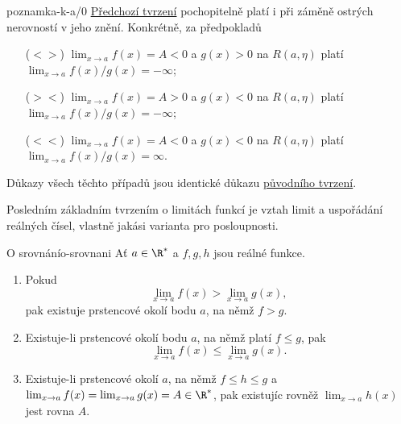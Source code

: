 \begin{remark}{}{poznamka-k-a/0}
 \hyperref[prop:limita-a/0]{Předchozí tvrzení} pochopitelně platí i při záměně
 ostrých nerovností v jeho znění. Konkrétně, za předpokladů
 \begin{itemize}
  \item[($< >$)] $\lim_{x \to a} f(x) = A < 0$ a $g(x) > 0$ na $R(a,\eta)$ platí
   $\lim_{x \to a} f(x) / g(x) = -\infty$;
  \item[($> <$)] $\lim_{x \to a} f(x) = A > 0$ a $g(x) < 0$ na $R(a,\eta)$ platí
   $\lim_{x \to a} f(x) / g(x) = -\infty$;
  \item[($< <$)] $\lim_{x \to a} f(x) = A < 0$ a $g(x) < 0$ na $R(a,\eta)$ platí
   $\lim_{x \to a} f(x) / g(x) = \infty$.
 \end{itemize}
 Důkazy všech těchto případů jsou identické důkazu
 \hyperref[prop:limita-a/0]{původního tvrzení}.
\end{remark}

Posledním základním tvrzením o limitách funkcí je vztah limit a uspořádání
reálných čísel, vlastně jakási varianta 
pro posloupnosti.

\begin{theorem}{O srovnání}{o-srovnani}
 Ať $a \in \R^{*}$ a $f,g,h$ jsou reálné funkce.
 \begin{enumerate}[label=(\alph*)]
  \item Pokud
   \[
    \lim_{x \to a} f(x) > \lim_{x \to a} g(x),
   \]
   pak existuje prstencové okolí bodu $a$, na němž $f > g$.
  \item Existuje-li prstencové okolí bodu $a$, na němž platí $f \leq g$, pak
   \[
    \lim_{x \to a} f(x) \leq \lim_{x \to a} g(x).
   \]
  \item Existuje-li prstencové okolí $a$, na němž $f \leq h \leq g$ a $\lim_{x
   \to a} f(x) = \lim_{x \to a} g(x) = A \in \R^{*}$, pak existujíc rovněž
   $\lim_{x \to a} h(x)$ jest rovna $A$.
 \end{enumerate}
\end{theorem}

